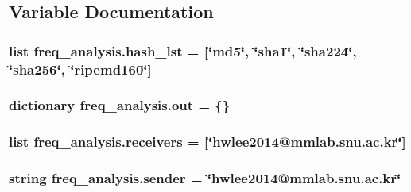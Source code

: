 \subsection{Variable Documentation}
\hypertarget{namespacefreq__analysis_a81cba3f06fcc98f6122fba48f2ec8ede}{
\subsubsection[{hash\-\_\-lst}]{\setlength{\rightskip}{0pt plus 5cm}list freq\-\_\-analysis.\-hash\-\_\-lst = \mbox{[}\char`\"{}md5\char`\"{}, \char`\"{}sha1\char`\"{}, \char`\"{}sha224\char`\"{}, \char`\"{}sha256\char`\"{}, \char`\"{}ripemd160\char`\"{}\mbox{]}}}\label{namespacefreq__analysis_a81cba3f06fcc98f6122fba48f2ec8ede}
\hypertarget{namespacefreq__analysis_a785df9fec2e819d13340b87713ad0fd1}{
\subsubsection[{out}]{\setlength{\rightskip}{0pt plus 5cm}dictionary freq\-\_\-analysis.\-out = \{\}}}\label{namespacefreq__analysis_a785df9fec2e819d13340b87713ad0fd1}
\hypertarget{namespacefreq__analysis_a91e8242f6e2afaf7f39111c0b1d1784b}{
\subsubsection[{receivers}]{\setlength{\rightskip}{0pt plus 5cm}list freq\-\_\-analysis.\-receivers = \mbox{[}\char`\"{}hwlee2014@mmlab.\-snu.\-ac.\-kr\char`\"{}\mbox{]}}}\label{namespacefreq__analysis_a91e8242f6e2afaf7f39111c0b1d1784b}
\hypertarget{namespacefreq__analysis_a4e41efc52e7d226b2a5c2a02edc4c0a3}{
\subsubsection[{sender}]{\setlength{\rightskip}{0pt plus 5cm}string freq\-\_\-analysis.\-sender = \char`\"{}hwlee2014@mmlab.\-snu.\-ac.\-kr\char`\"{}}}\label{namespacefreq__analysis_a4e41efc52e7d226b2a5c2a02edc4c0a3}
